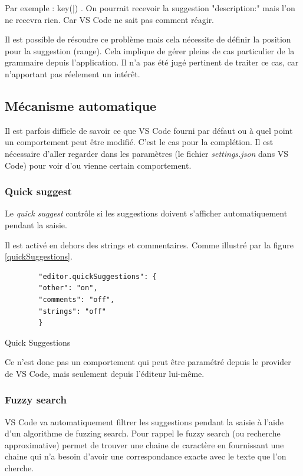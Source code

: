 \documentclass[
    iict, %
    il, %
]{heig-tb}
\begin{document}
Par exemple : { key(|) }.
On pourrait recevoir la suggestion "description:" mais l'on ne recevra rien. Car VS Code ne sait pas comment réagir.

Il est possible de résoudre ce problème mais cela nécessite de définir la position pour la suggestion (range).
Cela implique de gérer pleins de cas particulier de la grammaire depuis l'application. Il n'a pas été jugé pertinent de traiter ce cas, car n'apportant pas réelement un intérêt.

\subsection{Mécanisme automatique}

Il est parfois difficle de savoir ce que VS Code fourni par défaut ou à quel point un comportement peut être modifié.
C'est le cas pour la complétion. Il est nécessaire d'aller regarder dans les paramètres (le fichier \emph{settings.json} dans VS Code) pour voir d'ou vienne certain comportement.

\subsubsection{Quick suggest}

Le \emph{quick suggest} contrôle si les suggestions doivent s'afficher automatiquement pendant la saisie.

Il est activé en dehors des strings et commentaires. Comme illustré par la figure \ref{quickSuggestions}.

\begin{listing}[!ht]
    \begin{verbatim}
        "editor.quickSuggestions": {
        "other": "on",
        "comments": "off",
        "strings": "off"
        }
    \end{verbatim}
    \caption{Quick Suggestions}
    \label{quickSuggestions}
\end{listing}

Ce n'est donc pas un comportement qui peut être paramétré depuis le provider de VS Code, mais seulement depuis l'éditeur lui-même. \cite{quick-suggestion}

\subsubsection{Fuzzy search}

VS Code va automatiquement filtrer les suggestions pendant la saisie à l'aide d'un algorithme de fuzzing search.
Pour rappel le fuzzy search (ou recherche approximative) permet de trouver une chaine de caractère en fournissant une chaine qui n'a besoin d'avoir une correspondance exacte
avec le texte que l'on cherche.
\end{document}
